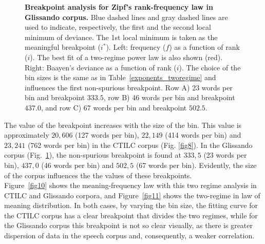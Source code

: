 \documentclass[10pt,letterpaper]{article}
\newif\ifarxiv
\begin{document}
\begin{figure}[!h]
\ifarxiv
\begin{subfigure}[t]{0.03\textwidth}
    \textbf{A}
  \end{subfigure}
\begin{subfigure}{0.97\textwidth}
\texttt{[image: DIEC2\_GLISSANDO\_senseCG\_zipf\_grup\_1\_two\_regime10.pdf]}
\end{subfigure}
\begin{subfigure}[t]{0.03\textwidth}
    \textbf{B}
  \end{subfigure}
\begin{subfigure}{0.97\textwidth}
\texttt{[image: DIEC2\_GLISSANDO\_senseCG\_zipf\_grup\_5\_two\_regime10.pdf]}
\end{subfigure}
\begin{subfigure}[t]{0.03\textwidth}
    \textbf{C}
  \end{subfigure}
\begin{subfigure}{0.97\textwidth}
\texttt{[image: DIEC2\_GLISSANDO\_senseCG\_zipf\_grup\_10\_two\_regime10.pdf]}
\end{subfigure}
\fi
\caption{\textbf{Breakpoint analysis for Zipf's rank-frequency law in Glissando corpus.}
Blue dashed lines and gray dashed lines are used to indicate, respectively, the first and the second local minimum of deviance. The 1st local minimum is taken as the meaningful breakpoint ($i^*$).
Left: frequency ($f$) as a function of rank ($i$). The best fit of a two-regime power law is also shown (red). Right: Baayen's deviance as a function of rank ($i$). The choice of the bin sizes is the same as in Table~\ref{exponents_tworegime} and influences the first non-spurious breakpoint. Row A) 23 words per bin and breakpoint $333.5$, row B) 46 words per bin and breakpoint $437.0$, and row C) 67 words per bin and breakpoint $502.5$.
}
\label{fig9}
\end{figure}

The value of the breakpoint increases with the size of the bin. This value is approximately $20,606$ (127 words per bin), $22,149$ (414 words per bin) and $23,241$ (762 words per bin)
in the CTILC corpus (Fig. \ref{fig8}).
In the Glissando corpus (Fig.~\ref{fig9}), the non-spurious breakpoint is found at $333,5$ (23 words per bin), $437,0$  (46 words per bin) and $502,5$ (67 words per bin). Evidently, the size of the corpus influences the the values of these breakpoints.\\

Figure~\ref{fig10} shows the meaning-frequency law with this two regime analysis in CTILC and Glissando corpora, and Figure~\ref{fig11} shows the two-regime in law of meaning distribution. In both cases, by varying the bin size, the fitting curve for the CTILC corpus has a clear breakpoint that divides the two regimes, while for the Glissando corpus this breakpoint is not so clear visually, as there is greater dispersion of data in the speech corpus and, consequently, a weaker correlation.\\
\end{document}
